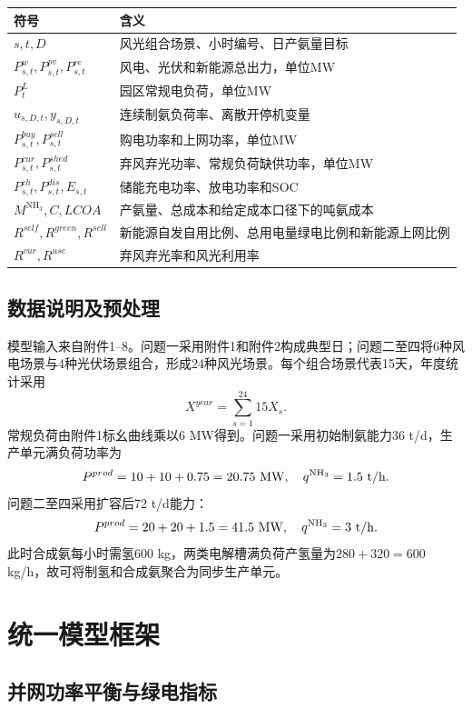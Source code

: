 \documentclass[UTF8,a4paper,12pt]{ctexart}
\newcommand{\NHthree}{\mathrm{NH_3}}
\newcommand{\Rself}{R^{self}}
\newcommand{\Rgreen}{R^{green}}
\newcommand{\Rsell}{R^{sell}}
\begin{document}
\begin{longtable}{p{}p{}}
\toprule
符号 & 含义 \\
\midrule
\endhead
$s,t,D$ & 风光组合场景、小时编号、日产氨量目标 \\
$P^w_{s,t},P^{pv}_{s,t},P^{re}_{s,t}$ & 风电、光伏和新能源总出力，单位MW \\
$P^L_t$ & 园区常规电负荷，单位MW \\
$u_{s,D,t},y_{s,D,t}$ & 连续制氨负荷率、离散开停机变量 \\
$P^{buy}_{s,t},P^{sell}_{s,t}$ & 购电功率和上网功率，单位MW \\
$P^{cur}_{s,t},P^{shed}_{s,t}$ & 弃风弃光功率、常规负荷缺供功率，单位MW \\
$P^{ch}_{s,t},P^{dis}_{s,t},E_{s,t}$ & 储能充电功率、放电功率和SOC \\
$M^{\NHthree},C,LCOA$ & 产氨量、总成本和给定成本口径下的吨氨成本 \\
$\Rself,\Rgreen,\Rsell$ & 新能源自发自用比例、总用电量绿电比例和新能源上网比例 \\
$R^{cur},R^{use}$ & 弃风弃光率和风光利用率 \\
\bottomrule
\end{longtable}

\subsection{数据说明及预处理}

模型输入来自附件1--8。问题一采用附件1和附件2构成典型日；问题二至四将6种风电场景与4种光伏场景组合，形成24种风光场景。每个组合场景代表15天，年度统计采用
\[
X^{year}=\sum_{s=1}^{24}15X_s .
\]
常规负荷由附件1标幺曲线乘以6 MW得到。问题一采用初始制氨能力36 t/d，生产单元满负荷功率为
\[
P^{prod}=10+10+0.75=20.75\ {\rm MW},\quad q^{\NHthree}=1.5\ {\rm t/h}.
\]
问题二至四采用扩容后72 t/d能力：
\[
P^{prod}=20+20+1.5=41.5\ {\rm MW},\quad q^{\NHthree}=3\ {\rm t/h}.
\]
此时合成氨每小时需氢600 kg，两类电解槽满负荷产氢量为$280+320=600$ kg/h，故可将制氢和合成氨聚合为同步生产单元。

\section{统一模型框架}

\subsection{并网功率平衡与绿电指标}
\end{document}
